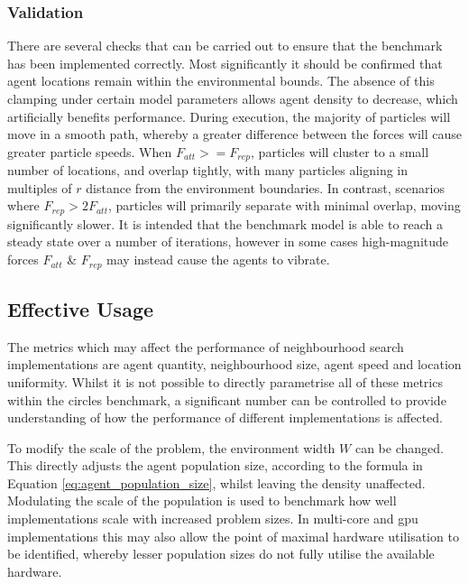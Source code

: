         
    \subsubsection{Validation}
      There are several checks that can be carried out to ensure that the benchmark has been implemented correctly. Most significantly it should be confirmed that agent locations remain within the environmental bounds. The absence of this clamping under certain model parameters allows agent density to decrease, which artificially benefits performance. During execution, the majority of particles will move in a smooth path, whereby a greater difference between the forces will cause greater particle speeds. When $F_{att} >= F_{rep}$, particles will cluster to a small number of locations, and overlap tightly, with many particles aligning in multiples of $r$ distance from the environment boundaries. In contrast, scenarios where $F_{rep} > 2F_{att}$, particles will primarily separate with minimal overlap, moving significantly slower. It is intended that the benchmark model is able to reach a steady state over a number of iterations, however in some cases high-magnitude forces $F_{att}$ \& $F_{rep}$ may instead cause the agents to vibrate. 
  
  \subsection{Effective Usage\label{sec:effective-usage}}  
\vspace{-0.3cm}
    The metrics which may affect the performance of neighbourhood search implementations are agent quantity, neighbourhood size, agent speed and location uniformity. Whilst it is not possible to directly parametrise all of these metrics within the circles benchmark, a significant number can be controlled to provide understanding of how the performance of different implementations is affected.
    
    To modify the scale of the problem, the environment width $W$ can be changed. This directly adjusts the agent population size, according to the formula in Equation \ref{eq:agent_population_size}, whilst leaving the density unaffected. Modulating the scale of the population is used to benchmark how well implementations scale with increased problem sizes. In multi-core and \gls{gpu} implementations this may also allow the point of maximal hardware utilisation to be identified, whereby lesser population sizes do not fully utilise the available hardware.
    
